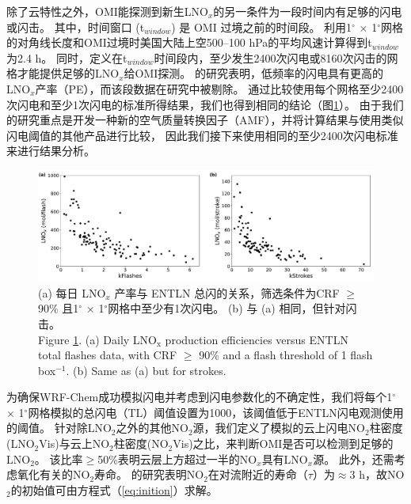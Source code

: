 除了云特性之外，OMI能探测到新生LNO$_x$的另一条件为一段时间内有足够的闪电或闪击。
其中，时间窗口 (t$_{window}$) 是 OMI 过境之前的时间段。
\citet{Lapierre.2020}利用1$^{\circ}$ $\times$ 1$^{\circ}$网格的对角线长度和OMI过境时美国大陆上空500--100 hPa的平均风速计算得到t$_{window}$为2.4 h。
同时，\citet{Lapierre.2020}定义在t$_{window}$时间段内，至少发生2400次闪电或8160次闪击的网格才能提供足够的LNO$_x$给OMI探测。
\citet{Bucsela.2019}的研究表明，低频率的闪电具有更高的LNO$_x$产率（PE），而该段数据在\citet{Lapierre.2020}研究中被剔除。
通过比较使用每个网格至少2400次闪电和至少1次闪电的标准所得结果，我们也得到相同的结论（图\ref{fig:flash_threshold}）。
由于我们的研究重点是开发一种新的空气质量转换因子（AMF），并将计算结果与使用类似闪电阈值的其他产品进行比较\citep{Pickering.2016,Lapierre.2020}，
因此我们接下来使用相同的至少2400次闪电标准来进行结果分析。


\begin{figure}[h]
    \includegraphics[width=15cm]{./figures/flash_threshold.pdf}
    \caption{
    (a) 每日 LNO$_x$ 产率与 ENTLN 总闪的关系，筛选条件为CRF $\geq$ 90\% 且1$^{\circ}$ $\times$ 1$^{\circ}$网格中至少有1次闪电。
     (b) 与 (a) 相同，但针对闪击。\\
    Figure \ref{fig:flash_threshold}. (a) Daily LNO$_\textrm{x}$ production efficiencies versus ENTLN total flashes data, with CRF $\geq$ 90\% and a flash threshold of 1 flash box$^{-1}$.
    (b) Same as (a) but for strokes.}
    \label{fig:flash_threshold}
\end{figure}


为确保WRF-Chem成功模拟闪电并考虑到闪电参数化的不确定性，我们将每个1$^{\circ}$ $\times$ 1$^{\circ}$网格模拟的总闪电（TL）阈值设置为1000，该阈值低于ENTLN闪电观测使用的阈值。
针对除LNO$_2$之外的其他NO$_2$源，我们定义了模拟的云上闪电NO$_2$柱密度(LNO$_2$Vis)与云上NO$_2$柱密度(NO$_2$Vis)之比，来判断OMI是否可以检测到足够的LNO$_2$。
该比率$\geq$50\%表明云层上方超过一半的NO$_x$具有LNO$_x$源。
此外，还需考虑氧化有关的NO$_2$寿命。
\citet{Nault.2017}的研究表明NO$_2$在对流附近的寿命（$\tau$）为$\approx$3 h，故NO$_2$的初始值可由方程式（\ref{eq:inition}）求解。

